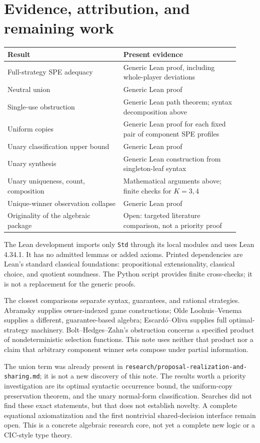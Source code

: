 \documentclass[11pt]{article}
\begin{document}
\section{Evidence, attribution, and remaining work}

\begin{center}
\small
\begin{tabular}{@{}p{0.46\linewidth}p{0.46\linewidth}@{}}
\toprule
Result & Present evidence\\
\midrule
Full-strategy SPE adequacy & Generic Lean proof, including whole-player deviations\\
Neutral union & Generic Lean proof\\
Single-use obstruction & Generic Lean path theorem; syntax decomposition above\\
Uniform copies & Generic Lean proof for each fixed pair of component SPE profiles\\
Unary classification upper bound & Generic Lean proof\\
Unary synthesis & Generic Lean construction from singleton-leaf syntax\\
Unary uniqueness, count, composition & Mathematical arguments above; finite checks for $K=3,4$\\
Unique-winner observation collapse & Generic Lean proof\\
Originality of the algebraic package & Open: targeted literature comparison, not a priority proof\\
\bottomrule
\end{tabular}
\end{center}

The Lean development imports only \texttt{Std} through its local modules and uses Lean
4.34.1. It has no admitted lemmas or added axioms. Printed dependencies
are Lean's standard classical foundations: propositional extensionality,
classical choice, and quotient soundness. The Python script provides
finite cross-checks; it is not a replacement for the generic proofs.

The closest comparisons separate syntax, guarantees, and rational
strategies. Abramsky supplies owner-indexed game constructions;
Olde Loohuis--Venema supplies a different, guarantee-based algebra;
Escard\'o--Oliva supplies full optimal-strategy machinery.
Bolt--Hedges--Zahn's obstruction concerns a specified product of
nondeterministic selection functions\cite{BoltHedgesZahn2019}. This note
uses neither that product nor a claim that arbitrary component winner
sets compose under partial information.

The union term was already present in
\texttt{research/proposal-realization-and-sharing.md}; it is not a new
discovery of this note. The results worth a priority investigation are
its optimal syntactic occurrence bound, the uniform-copy preservation
theorem, and the unary normal-form classification. Searches did not find
these exact statements, but that does not establish novelty. A complete
equational axiomatization and the first nontrivial shared-decision
interface remain open. This is a concrete algebraic research core, not
yet a complete new logic or a CIC-style type theory.



\end{document}

